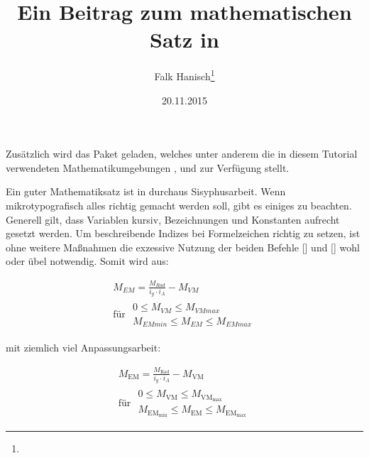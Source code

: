 \documentclass[english,ngerman]{tudscrartcl}
\begin{document}
\date{20.11.2015}
\author{Falk Hanisch\thanks{\noexpand\scriptsize\noexpand\Email{\tudscrmail}}}
\title{Ein Beitrag zum mathematischen Satz in }
\makeatletter
\begingroup%
  \def\and{, }%
  \let\thanks\@gobble%
  \let\footnote\@gobble%
\endgroup%
\markright{\@title}
\makeatother
\StartTutorial
%
%
Zusätzlich wird das Paket  geladen, welches unter anderem die 
in diesem Tutorial verwendeten Mathematikumgebungen , 
 und  zur Verfügung stellt.
%
\begin{Preamble}
\usepackage{amsmath}
\end{Preamble}
%
Ein guter Mathematiksatz ist in  durchaus Sisyphusarbeit. Wenn 
mikrotypografisch alles richtig gemacht werden soll, gibt es einiges zu 
beachten. Generell gilt, dass Variablen kursiv, Bezeichnungen und Konstanten
aufrecht gesetzt werden. Um beschreibende Indizes bei Formelzeichen richtig zu 
setzen, ist ohne weitere Maßnahmen die exzessive Nutzung der beiden Befehle 
[\PParameter{\dots}] und [\PParameter{\dots}] wohl 
oder übel notwendig. Somit wird aus:
%
\begin{Trunk*}
\begin{equation*}
\begin{gathered}
M_{EM} =  - M_{VM} \\
\textrm{für }
\begin{aligned}
0\leq M_{VM}\leq M_{VMmax} \\ 
M_{EMmin}\leq M_{EM}\leq M_{EMmax}
\end{aligned}
\end{gathered}
\end{equation*}

\end{Trunk*}
%
mit ziemlich viel Anpassungsarbeit:
%
\begin{Trunk*}
\begin{equation*}
\begin{gathered}
M_ =  - M_ \\
\textrm{für }
\begin{aligned}
0\leq M_\leq M_ \\ 
M_\leq M_\leq M_
\end{aligned}
\end{gathered}
\end{equation*}

\end{Trunk*}
\end{document}

